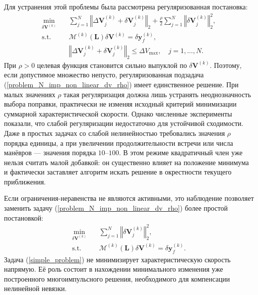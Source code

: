 Для устранения этой проблемы была рассмотрена регуляризованная постановка:
\begin{equation}
\begin{aligned}
    \min_{\delta \mathbf{V}^{(k)}} \quad &\sum_{j=1}^N \left\Vert \Delta \mathbf{V}_j^{(k)} + \delta \mathbf{V}_j^{(k)} \right\Vert_2 + 
    \frac{\rho}{2} \sum_{j=1}^N \left\Vert \delta \mathbf{V}_j^{(k)} \right\Vert_2^2, \\
    \text{s.t.} \quad &\mathcal{M}^{(k)} (\mathbf{L}) \delta \mathbf{V}^{(k)} = \delta \mathbf{y}_f^{(k)}, \\
    & \left\Vert \Delta \mathbf{V}_j^{(k)} + \delta \mathbf{V}_j^{(k)} \right\Vert_2 \leq \Delta V_{\text{max}}, \quad j = 1, \dots, N.
\end{aligned}
\label{problem_N_imp_non_linear_dv_rho}
\end{equation}
При $\rho > 0$ целевая функция становится сильно выпуклой по $\delta \mathbf{V}^{(k)}$. Поэтому, если допустимое множество непусто, регуляризованная подзадача (\ref{problem_N_imp_non_linear_dv_rho}) имеет единственное решение. При малых значениях $\rho$ такая регуляризация должна лишь устранять неоднозначность выбора поправки, практически не изменяя исходный критерий минимизации суммарной характеристической скорости. Однако численные эксперименты показали, что слабой регуляризации недостаточно для устойчивой сходимости. Даже в простых задачах со слабой нелинейностью требовались значения $\rho$ порядка единицы, а при увеличении продолжительности встречи или числа манёвров — значения порядка $10$--$100$. В этом режиме квадратичный член уже нельзя считать малой добавкой: он существенно влияет на положение минимума и фактически заставляет алгоритм искать решение в окрестности текущего приближения.

Если ограничения-неравенства не являются активными, это наблюдение позволяет заменить задачу (\ref{problem_N_imp_non_linear_dv_rho}) более простой постановкой:
\begin{equation}
\begin{aligned}
    \min_{\delta \mathbf{V}^{(k)}} \quad &\sum_{j=1}^N \left\Vert \delta \mathbf{V}_j^{(k)} \right\Vert_2^2, \\
    \text{s.t.} \quad &\mathcal{M}^{(k)} (\mathbf{L}) \delta \mathbf{V}^{(k)} = \delta \mathbf{y}_f^{(k)}.
\end{aligned}
\label{simple_problem}
\end{equation}
Задача (\ref{simple_problem}) не минимизирует характеристическую скорость напрямую. Её роль состоит в нахождении минимального изменения уже построенного многоимпульсного решения, необходимого для компенсации нелинейной невязки.

